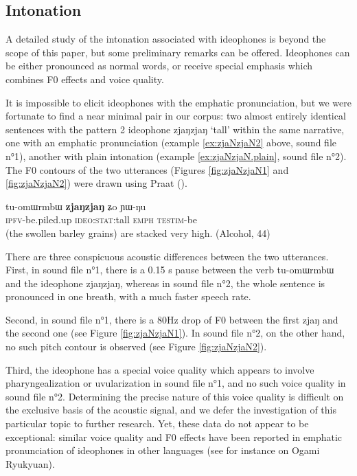 \documentclass[oldfontcommands,oneside,a4paper,11pt]{article}
\newcommand{\ipa}[1]{{\phon \mbox{#1}}} %
\begin{document}
\subsection{Intonation}
A detailed study of the intonation associated with ideophones is beyond the scope of this paper, but some preliminary remarks can be offered. Ideophones can be either pronounced as normal words, or receive special emphasis which combines F0 effects and voice quality. 

It is impossible to elicit ideophones with the emphatic pronunciation, but we were fortunate to find a near minimal pair in our corpus: two almost entirely identical sentences with the pattern 2 ideophone \ipa{zjaŋzjaŋ} `tall' within the same narrative, one  with an emphatic pronunciation (example \ref{ex:zjaNzjaN2} above, sound file n°1), another with plain intonation (example \ref{ex:zjaNzjaN.plain}, sound file n°2). The F0 contours of the two utterances (Figures  \ref{fig:zjaNzjaN1} and  \ref{fig:zjaNzjaN2}) were drawn using Praat (\citealt{boersma.praat}).

  \begin{exe} 
\ex  \label{ex:zjaNzjaN.plain}
\gll 
 	\ipa{tu-omɯrmbɯ}  	\ipa{\textbf{zjaŋzjaŋ}}  	\ipa{ʑo}  	\ipa{ɲɯ-ŋu}  \\
  \textsc{ipfv}-be.piled.up \textsc{ideo:stat}:tall \textsc{emph} \textsc{testim}-be  \\
 \glt  (the swollen barley grains) are stacked very high.  (Alcohol, 44)
 \end{exe}
 
 
 There are three conspicuous acoustic differences between the two utterances. First, in sound file n°1, there is a 0.15 s pause between the verb 	\ipa{tu-omɯrmbɯ} and the ideophone \ipa{zjaŋzjaŋ}, whereas in sound file n°2, the whole sentence is pronounced in one breath, with a much faster speech rate. 
 
  Second, in sound file n°1, there is a 80Hz drop of F0 between the first \ipa{zjaŋ} and the second one (see Figure \ref{fig:zjaNzjaN1}). In sound file n°2, on the other hand, no such pitch contour is observed (see Figure \ref{fig:zjaNzjaN2}).

Third, the ideophone has a special voice quality which appears to involve pharyngealization or uvularization in sound file n°1, and no such voice quality     in sound file n°2. Determining the precise nature of this voice quality is difficult on the exclusive basis of the acoustic signal, and we defer the investigation of this particular topic to further research. Yet, these data do not appear to be exceptional: similar voice quality and F0 effects have been reported in emphatic pronunciation of ideophones in other languages (see for instance \citealt[109]{pellard09ogami} on Ogami Ryukyuan).
 
\end{document}
